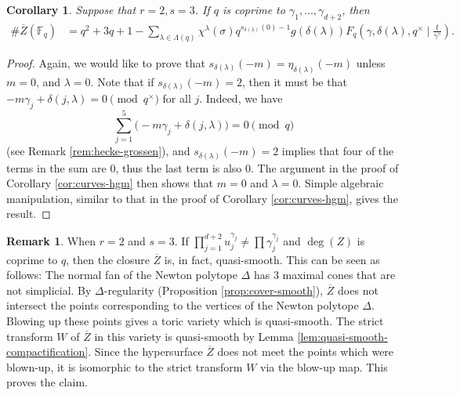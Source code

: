 \documentclass[11pt, reqno]{amsart}
\theoremstyle{plain}
\newtheorem{corol}[theo]{Corollary}
\theoremstyle{definition}
\newtheorem{rem}[theo]{Remark}
\newcommand{\F}{\mathbb{F}}
\newcommand{\ga}{\gamma}
\begin{document}
\begin{corol}\label{cor:surfaces-hgm}
Suppose that $r=2, s=3$.  If $q$ is coprime to $\ga_1,\dots,\ga_{d+2}$, then
\begin{align*}
      \#\overline{Z}(\F_q)&= q^2+3q +1  -\sum_{\lambda \in \Lambda(q)} \chi^{\lambda}(\sigma) q^{s_{\delta(\lambda)}(0)-1} g(\delta(\lambda))  F_q\left(\gamma,\delta(\lambda), q^\times \mid \frac{t}{\gamma^\gamma}\right).
  \end{align*}
\end{corol}


\begin{proof}
Again, we would like to prove that $s_{\delta(\lambda)}(-m) = \eta_{\delta(\lambda)}(-m)$ unless $m=0$, and $\lambda=0$. 
Note that if $s_{\delta(\lambda)}(-m)=2$, then it must be that $-m \ga_j + \delta(j,\lambda)=0 \pmod{q^\times}$ for all $j$. Indeed, we have
\[
\sum_{j=1}^5 \big( -m \ga_j + \delta(j,\lambda) \big) =  0 \pmod{q}
\]
(see Remark \ref{rem:hecke-grossen}),
and $s_{\delta(\lambda)}(-m)=2$  implies that four of the terms in the sum are $0$, thus the last term is also $0$.
The argument in the proof of Corollary \ref{cor:curves-hgm} then shows that $m=0$ and $\lambda=0$.
Simple algebraic manipulation, similar to that in the proof of Corollary \ref{cor:curves-hgm}, gives the result. 
\end{proof}

\begin{rem}
    When $r=2$ and $s=3$. If $\prod_{j=1}^{d+2} u_j^{\gamma_j} \neq \prod \gamma_j^{\gamma_j}$ and $\deg(Z)$ is coprime to $q$,
    then the closure $\overline{Z}$ is, in fact, quasi-smooth. This can be seen as follows:
    The normal fan of the Newton polytope $\Delta$ has $3$ maximal cones that are not simplicial. By $\Delta$-regularity (Proposition \ref{prop:cover-smooth}), $\overline{Z}$ does not intersect the points corresponding to the vertices of the Newton polytope $\Delta$. Blowing up these points gives a toric variety which is quasi-smooth.  The strict transform $W$ of $\overline{Z}$ in this variety is quasi-smooth by Lemma \ref{lem:quasi-smooth-compactification}. 
    Since the hypersurface $\overline{Z}$ does not meet the points which were blown-up, it is isomorphic to the strict transform $W$ via the blow-up map. This proves the claim.
\end{rem}
\end{document}
